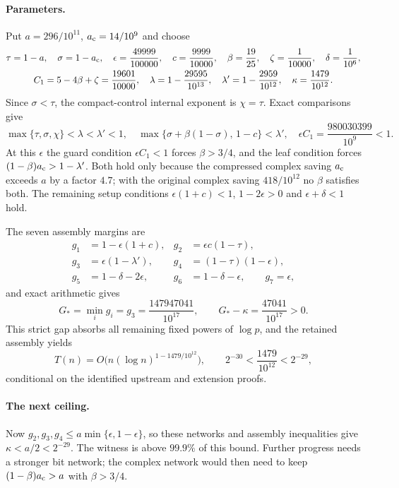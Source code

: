 \documentclass[11pt]{article}
\begin{document}
\paragraph{Parameters.} Put $a=296/10^{11}$, $a_{\rm c}=14/10^9$ and choose
\begin{gather*}
 \tau=1-a,\quad\sigma=1-a_{\rm c},\quad
 \epsilon=\frac{49999}{100000},\quad c=\frac{9999}{10000},\quad
 \beta=\frac{19}{25},\quad\zeta=\frac1{10000},\quad\delta=\frac1{10^6},\\
 C_1=5-4\beta+\zeta=\frac{19601}{10000},\quad
 \lambda=1-\frac{29595}{10^{13}},\quad
 \lambda'=1-\frac{2959}{10^{12}},\quad
 \kappa=\frac{1479}{10^{12}}.
\end{gather*}
Since $\sigma<\tau$, the compact-control internal exponent is $\chi=\tau$.
Exact comparisons give
\[
 \max\{\tau,\sigma,\chi\}<\lambda<\lambda'<1,\quad
 \max\{\sigma+\beta(1-\sigma),\,1-c\}<\lambda',\quad
 \epsilon C_1=\frac{980030399}{10^{9}}<1.
\]
At this $\epsilon$ the guard condition $\epsilon C_1<1$ forces $\beta>3/4$,
and the leaf condition forces $(1-\beta)a_{\rm c}>1-\lambda'$. Both hold only because the
compressed complex saving $a_{\rm c}$ exceeds $a$ by a factor $4.7$; with the
original complex saving $418/10^{12}$ no $\beta$ satisfies both. The remaining
setup conditions $\epsilon(1+c)<1$, $1-2\epsilon>0$ and $\epsilon+\delta<1$
hold.

The seven assembly margins are
\begin{align*}
 g_1&=1-\epsilon(1+c),&g_2&=\epsilon c(1-\tau),\\
 g_3&=\epsilon(1-\lambda'),&g_4&=(1-\tau)(1-\epsilon),\\
 g_5&=1-\delta-2\epsilon,&g_6&=1-\delta-\epsilon,\qquad g_7=\epsilon,
\end{align*}
and exact arithmetic gives
\[
 G_*=\min_ig_i=g_3=\frac{147947041}{10^{17}},\qquad
 G_*-\kappa=\frac{47041}{10^{17}}>0.
\]
This strict gap absorbs all remaining fixed powers of $\log p$, and the
retained assembly yields
\[
 T(n)=O\bigl(n(\log n)^{1-1479/10^{12}}\bigr),\qquad
 2^{-30}<\frac{1479}{10^{12}}<2^{-29},
\]
conditional on the identified upstream and extension proofs.

\paragraph{The next ceiling.} Now $g_2,g_3,g_4\le a\min\{\epsilon,1-\epsilon\}$,
so these networks and assembly inequalities give $\kappa<a/2<2^{-29}$. The
witness is above $99.9\%$ of this bound. Further progress needs a stronger
bit network; the complex network would then need to keep
$(1-\beta)a_{\rm c}>a$ with $\beta>3/4$.
\end{document}
